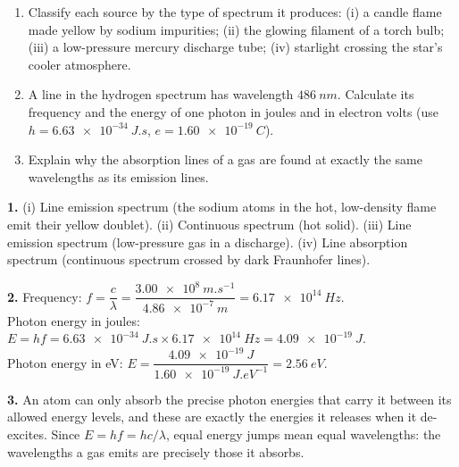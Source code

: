 \documentclass[11pt]{article}
\begin{document}
\begin{exercice}
\begin{enumerate}
\item Classify each source by the type of spectrum it produces: (i) a candle flame made yellow by sodium impurities; (ii) the glowing filament of a torch bulb; (iii) a low-pressure mercury discharge tube; (iv) starlight crossing the star's cooler atmosphere.
\item A line in the hydrogen spectrum has wavelength $\SI{486}{nm}$. Calculate its frequency and the energy of one photon in joules and in electron volts (use $h = \SI{6.63e-34}{J.s}$, $e = \SI{1.60e-19}{C}$).
\item Explain why the absorption lines of a gas are found at exactly the same wavelengths as its emission lines.
\end{enumerate}
\end{exercice}

\begin{corrige}[Exercise 1]
\textbf{1.} (i) Line emission spectrum (the sodium atoms in the hot, low-density flame emit their yellow doublet). (ii) Continuous spectrum (hot solid). (iii) Line emission spectrum (low-pressure gas in a discharge). (iv) Line absorption spectrum (continuous spectrum crossed by dark Fraunhofer lines).

\textbf{2.} Frequency: $f = \dfrac{c}{\lambda} = \dfrac{\SI{3.00e8}{m.s^{-1}}}{\SI{4.86e-7}{m}} = \SI{6.17e14}{Hz}$.\\
Photon energy in joules: $E = hf = \SI{6.63e-34}{J.s} \times \SI{6.17e14}{Hz} = \SI{4.09e-19}{J}$.\\
Photon energy in eV: $E = \dfrac{\SI{4.09e-19}{J}}{\SI{1.60e-19}{J.eV^{-1}}} = \SI{2.56}{eV}$.

\textbf{3.} An atom can only absorb the precise photon energies that carry it between its allowed energy levels, and these are exactly the energies it releases when it de-excites. Since $E = hf = hc/\lambda$, equal energy jumps mean equal wavelengths: the wavelengths a gas emits are precisely those it absorbs.
\end{corrige}
\end{document}
